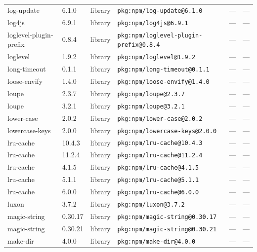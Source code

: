 \documentclass[11pt,a4paper]{article}
\begin{document}
\begin{longtable}{|p{4cm}|p{2cm}|p{1.6cm}|p{5cm}|p{1.5cm}|p{3.5cm}|}
\raggedright log-update & 6.1.0 & library & \small\texttt{pkg:npm/log-update@6.1.0} & — & \small — \\
\raggedright log4js & 6.9.1 & library & \small\texttt{pkg:npm/log4js@6.9.1} & — & \small — \\
\raggedright loglevel-plugin-prefix & 0.8.4 & library & \small\texttt{pkg:npm/loglevel-plugin-prefix@0.8.4} & — & \small — \\
\raggedright loglevel & 1.9.2 & library & \small\texttt{pkg:npm/loglevel@1.9.2} & — & \small — \\
\raggedright long-timeout & 0.1.1 & library & \small\texttt{pkg:npm/long-timeout@0.1.1} & — & \small — \\
\raggedright loose-envify & 1.4.0 & library & \small\texttt{pkg:npm/loose-envify@1.4.0} & — & \small — \\
\raggedright loupe & 2.3.7 & library & \small\texttt{pkg:npm/loupe@2.3.7} & — & \small — \\
\raggedright loupe & 3.2.1 & library & \small\texttt{pkg:npm/loupe@3.2.1} & — & \small — \\
\raggedright lower-case & 2.0.2 & library & \small\texttt{pkg:npm/lower-case@2.0.2} & — & \small — \\
\raggedright lowercase-keys & 2.0.0 & library & \small\texttt{pkg:npm/lowercase-keys@2.0.0} & — & \small — \\
\raggedright lru-cache & 10.4.3 & library & \small\texttt{pkg:npm/lru-cache@10.4.3} & — & \small — \\
\raggedright lru-cache & 11.2.4 & library & \small\texttt{pkg:npm/lru-cache@11.2.4} & — & \small — \\
\raggedright lru-cache & 4.1.5 & library & \small\texttt{pkg:npm/lru-cache@4.1.5} & — & \small — \\
\raggedright lru-cache & 5.1.1 & library & \small\texttt{pkg:npm/lru-cache@5.1.1} & — & \small — \\
\raggedright lru-cache & 6.0.0 & library & \small\texttt{pkg:npm/lru-cache@6.0.0} & — & \small — \\
\raggedright luxon & 3.7.2 & library & \small\texttt{pkg:npm/luxon@3.7.2} & — & \small — \\
\raggedright magic-string & 0.30.17 & library & \small\texttt{pkg:npm/magic-string@0.30.17} & — & \small — \\
\raggedright magic-string & 0.30.21 & library & \small\texttt{pkg:npm/magic-string@0.30.21} & — & \small — \\
\raggedright make-dir & 4.0.0 & library & \small\texttt{pkg:npm/make-dir@4.0.0} & — & \small — \\

\end{longtable}
\end{document}
